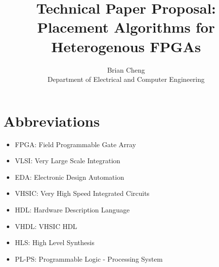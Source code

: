 \documentclass{article}
\begin{document}
\title{Technical Paper Proposal: \\ Placement Algorithms for Heterogenous FPGAs}
\author{Brian Cheng \\ Department of Electrical and Computer Engineering}


\date{}
\maketitle{}

\section{Abbreviations}
\begin{itemize}[label={--}, left=0.25cm] %
    \item FPGA: Field Programmable Gate Array
    \item VLSI: Very Large Scale Integration
    \item EDA: Electronic Design Automation
    \item VHSIC: Very High Speed Integrated Circuits
    \item HDL: Hardware Description Language
    \item VHDL: VHSIC HDL
    \item HLS: High Level Synthesis
    \item PL-PS: Programmable Logic - Processing System
\end{itemize}
\end{document}
